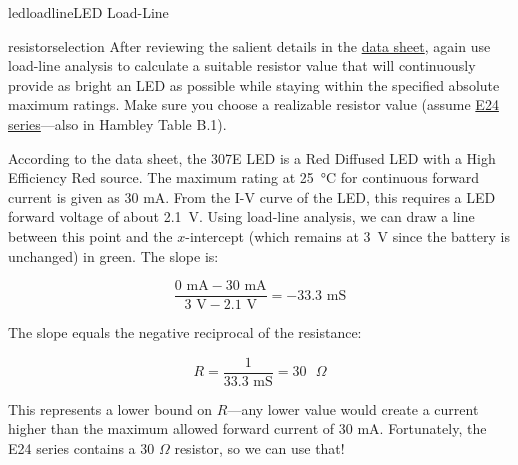 \begin{mainquestion}{ledloadline}{LED Load-Line}
\begin{partquestion}{resistorselection}
{After reviewing the salient details in the \href{https://www.jameco.com/Jameco/Products/ProdDS/697522.pdf}{data sheet}, again use load-line analysis to calculate a suitable resistor value that will continuously provide as bright an LED as possible while staying within the specified absolute maximum ratings. Make sure you choose a realizable resistor value (assume \href{https://asenergi.com/pdf/resistors/standard-resistor-values-e24.pdf}{E24 series}---also in Hambley Table B.1).}

\begin{answer}
According to the data sheet, the 307E LED is a Red Diffused LED with a High Efficiency Red source. The maximum rating at 25~°C for continuous forward current is given as 30 mA. From the I-V curve of the LED, this requires a LED forward voltage of about 2.1~V. Using load-line analysis, we can draw a line between this point and the $x$-intercept (which remains at 3~V since the battery is unchanged) in green. The slope is:

\[
\frac{0\text{ mA} - 30\text{ mA}}{3\text{ V} - 2.1\text{ V}} = -33.3\text{ mS}
\]

The slope equals the negative reciprocal of the resistance:

\[
R = \frac{1}{33.3\text{ mS}} = 30\text{ }\Omega
\]

This represents a lower bound on $R$---any lower value would create a current higher than the maximum allowed forward current of 30 mA. Fortunately, the E24 series contains a 30 $\Omega$ resistor, so we can use that!
\end{answer}
\end{partquestion}

\end{mainquestion}
